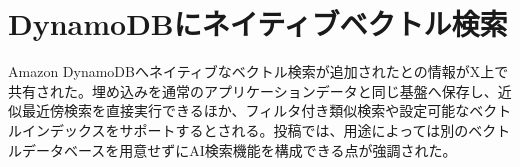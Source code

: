 \section{DynamoDBにネイティブベクトル検索}
Amazon DynamoDBへネイティブなベクトル検索が追加されたとの情報がX上で共有された。埋め込みを通常のアプリケーションデータと同じ基盤へ保存し、近似最近傍検索を直接実行できるほか、フィルタ付き類似検索や設定可能なベクトルインデックスをサポートするとされる。投稿では、用途によっては別のベクトルデータベースを用意せずにAI検索機能を構成できる点が強調された。

